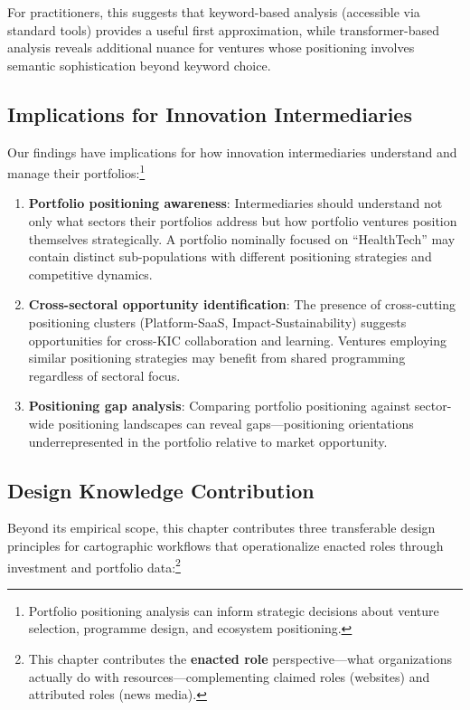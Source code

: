 \documentclass[../main.tex]{subfiles}
\begin{document}
For practitioners, this suggests that keyword-based analysis (accessible via standard tools) provides a useful first approximation, while transformer-based analysis reveals additional nuance for ventures whose positioning involves semantic sophistication beyond keyword choice.

\subsection{Implications for Innovation Intermediaries}

Our findings have implications for how innovation intermediaries understand and manage their portfolios:\footnote{Portfolio positioning analysis can inform strategic decisions about venture selection, programme design, and ecosystem positioning.}

\begin{enumerate}
    \item \textbf{Portfolio positioning awareness}: Intermediaries should understand not only what sectors their portfolios address but how portfolio ventures position themselves strategically. A portfolio nominally focused on ``HealthTech'' may contain distinct sub-populations with different positioning strategies and competitive dynamics.

    \item \textbf{Cross-sectoral opportunity identification}: The presence of cross-cutting positioning clusters (Platform-SaaS, Impact-Sustainability) suggests opportunities for cross-KIC collaboration and learning. Ventures employing similar positioning strategies may benefit from shared programming regardless of sectoral focus.

    \item \textbf{Positioning gap analysis}: Comparing portfolio positioning against sector-wide positioning landscapes can reveal gaps---positioning orientations underrepresented in the portfolio relative to market opportunity.
\end{enumerate}

\subsection{Design Knowledge Contribution}

Beyond its empirical scope, this chapter contributes three transferable design principles for cartographic workflows that operationalize enacted roles through investment and portfolio data:\footnote{This chapter contributes the \textbf{enacted role} perspective---what organizations actually do with resources---complementing claimed roles (websites) and attributed roles (news media).}
\end{document}
